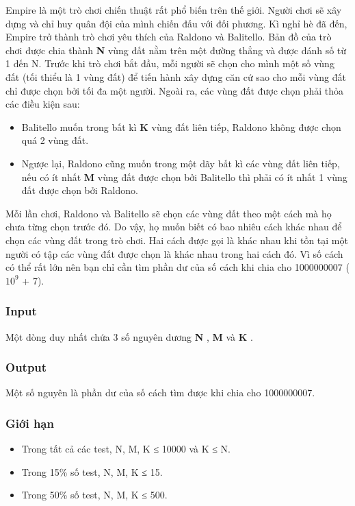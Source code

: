 



   Empire là một trò chơi chiến thuật rất phổ biến trên thế giới. Người chơi sẽ xây dựng và chỉ huy quân đội của mình chiến đấu với đối phương. Kì nghỉ hè đã đến, Empire trở thành trò chơi yêu thích của Raldono và Balitello. Bản đồ của trò chơi được chia thành   \textbf{    N   }   vùng đất nằm trên một đường thẳng và được đánh số từ 1 đến N. Trước khi trò chơi bắt đầu, mỗi người sẽ chọn cho mình một số vùng đất (tối thiểu là 1 vùng đất) để tiến hành xây dựng căn cứ sao cho mỗi vùng đất chỉ được chọn bởi tối đa một người. Ngoài ra, các vùng đất được chọn phải thỏa các điều kiện sau:  
\begin{itemize}
	\item     Balitello muốn trong bất kì    \textbf{     K    }    vùng đất liên tiếp, Raldono không được chọn quá 2 vùng đất.   
	\item     Ngược lại, Raldono cũng muốn trong một dãy bất kì các vùng đất liên tiếp, nếu có ít nhất    \textbf{     M    }    vùng đất được chọn bởi Balitello thì phải có ít nhất 1 vùng đất được chọn bởi Raldono.   
\end{itemize}

   Mỗi lần chơi, Raldono và Balitello sẽ chọn các vùng đất theo một cách mà họ chưa từng chọn trước đó. Do vậy, họ muốn biết có bao nhiêu cách khác nhau để chọn các vùng đất trong trò chơi. Hai cách được gọi là khác nhau khi tồn tại một người có tập các vùng đất được chọn là khác nhau trong hai cách đó. Vì số cách có thể rất lớn nên bạn chỉ cần tìm phần dư của số cách khi chia cho 1000000007 ($10^{9}$   + 7).  

\subsubsection{   Input  }

   Một dòng duy nhất chứa 3 số nguyên dương   \textbf{    N   }   ,   \textbf{    M   }   và   \textbf{    K   }   .  

\subsubsection{   Output  }

   Một số nguyên là phần dư của số cách tìm được khi chia cho 1000000007.  

\subsubsection{   Giới hạn  }
\begin{itemize}
	\item     Trong tất cả các test, N, M, K ≤ 10000 và K ≤ N.   
	\item     Trong 15\% số test, N, M, K ≤ 15.   
	\item     Trong 50\% số test, N, M, K ≤ 500.   
\end{itemize}


